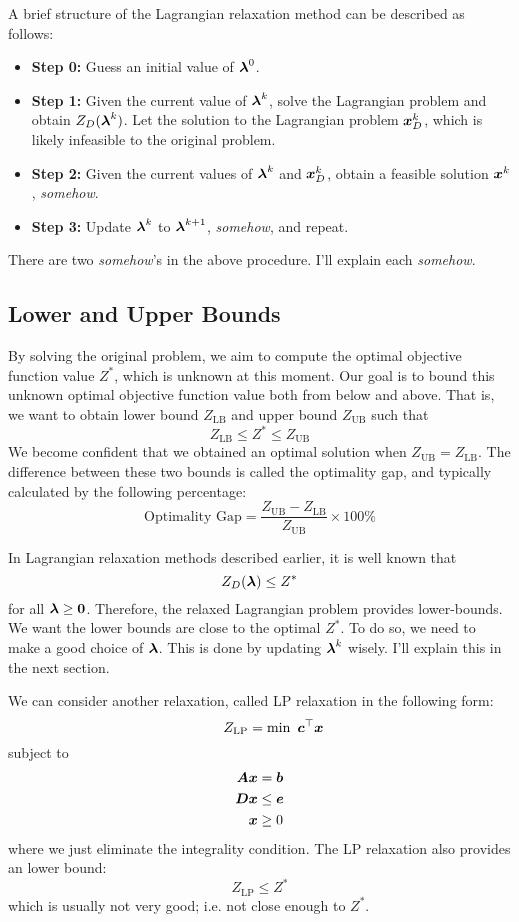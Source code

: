 A brief structure of the Lagrangian relaxation method can be described as follows:
\begin{itemize}
\item \textbf{Step 0:} Guess an initial value of $\boldsymbol{\lambda}^0$.
\item \textbf{Step 1:} Given the current value of $\boldsymbol{\lambda}^k$, solve the Lagrangian problem and obtain  $Z_D(\boldsymbol{\lambda}^k)$. Let the solution to the Lagrangian problem $\boldsymbol{x}_D^k$, which is likely infeasible to the original problem.
\item \textbf{Step 2:} Given the current values of $\boldsymbol{\lambda}^k$ and $\boldsymbol{x}_D^k$, obtain a feasible solution $\boldsymbol{x}^k$, \emph{somehow}.
\item \textbf{Step 3:} Update $\boldsymbol{\lambda}^k$ to $\boldsymbol{\lambda}^{k+1}$, \emph{somehow}, and repeat.
\end{itemize}
There are two \emph{somehow}'s in the above procedure. I'll explain each \emph{somehow}.

\subsection{Lower and Upper Bounds}

By solving the original problem, we aim to compute the optimal objective function value $Z^*$, which is unknown at this moment. Our goal is to bound this unknown optimal objective function value both from below and above. That is, we want to obtain lower bound $Z_{\text{LB}}$ and upper bound $Z_{\text{UB}}$ such that
\[
Z_{\text{LB}} \leq Z^* \leq Z_{\text{UB}}
\]
We become confident that we obtained an optimal solution when $Z_{\text{UB}}=Z_{\text{LB}}$. The difference between these two bounds is called the optimality gap, and typically calculated by the following percentage:
\[
\text{Optimality Gap} = \frac{ Z_{\text{UB}}-Z_{\text{LB}} } { Z_{\text{UB}} } \times 100 \%
\]

In Lagrangian relaxation methods described earlier, it is well known that
\[
	Z_D(\boldsymbol{\lambda}) \leq Z^*
\]
for all $\boldsymbol{\lambda}\geq\boldsymbol{0}$. Therefore, the relaxed Lagrangian problem provides lower-bounds. We want the lower bounds are close to the optimal $Z^*$. To do so, we need to make a good choice of $\boldsymbol{\lambda}$. This is done by updating $\boldsymbol{\lambda}^k$ wisely. I'll explain this in the next section.

We can consider another relaxation, called LP relaxation in the following form:
\begin{equation*}
\qquad Z_{\text{LP}} = \min \ \boldsymbol{c}^\top \boldsymbol{x}
\end{equation*}
subject to
\begin{align*}
\boldsymbol{A} \boldsymbol{x} &= \boldsymbol{b} \\
\boldsymbol{D} \boldsymbol{x} &\leq \boldsymbol{e} \\
\boldsymbol{x} & \geq 0
\end{align*}
where we just eliminate the integrality condition. The LP relaxation also provides an lower bound:
\[
	Z_{\text{LP}} \leq Z^*
\]
which is usually not very good; i.e. not close enough to $Z^*$.

